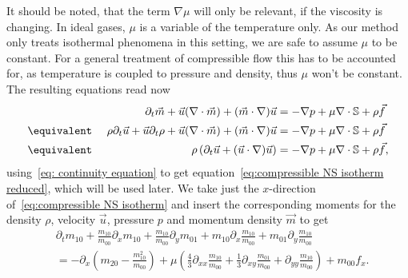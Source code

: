 It should be noted, that the term $\nabla \mu$ will only be relevant, if the viscosity is changing.
In ideal gases, $\mu$ is a variable of the temperature only.
As our method only treats isothermal phenomena in this setting, we are safe to assume $\mu$ to be constant.
For a general treatment of compressible flow this has to be accounted for, as temperature is coupled to pressure and density, thus $\mu$ won't be constant.
The resulting equations read now
\begin{alignat}{3}
  \label{eq:compressible NS isotherm}
  &&\partial_t \vec{m} + \vec{u}(\nabla \cdot \vec{m}) + (\vec{m} \cdot \nabla)\vec{u}
    &= - \nabla p + \mu \nabla \cdot \mathbb{S} + \rho \vec{f}\\
  \nonumber
  &\equivalent\ & \rho\partial_t \vec{u} + \vec{u}\partial_t \rho + \vec{u}(\nabla \cdot \vec{m}) + (\vec{m} \cdot \nabla)\vec{u}
    &= - \nabla p + \mu \nabla \cdot \mathbb{S} + \rho \vec{f}\\
  \label{eq:compressible NS isotherm reduced}
  &\equivalent& \rho\left(\partial_t \vec{u} + (\vec{u} \cdot \nabla)\vec{u}\right)
    &= - \nabla p + \mu \nabla \cdot \mathbb{S} + \rho \vec{f},
\end{alignat}
using~\eqref{eq: continuity equation} to get equation~\eqref{eq:compressible NS isotherm reduced}, which will be used later.
We take just the $x$-direction of~\eqref{eq:compressible NS isotherm} and insert the corresponding moments for the density $\rho$, velocity $\vec{u}$, pressure $p$ and momentum density $\vec{m}$ to get
\begin{equation}
  \label{eq: navier stokes goal}
  \begin{aligned}
    & \partial_t m_{10}
    + \frac{m_{10}}{m_{00}} \partial_x m_{10}
    + \frac{m_{10}}{m_{00}}\partial_y m_{01}
    + m_{10} \partial_x \frac{m_{10}}{m_{00}}
    + m_{01} \partial_y \frac{m_{10}}{m_{00}}
     \\
    & =
    - \partial_x \left(m_{20} - \frac{ m_{10}^2 }{ m_{00} } \right)
     + \mu \left(\frac{4}{3}\partial_{xx}\frac{m_{10}}{m_{00}}
            + \frac{1}{3}\partial_{xy} \frac{m_{01}}{m_{00}}
            + \partial_{yy} \frac{m_{10}}{m_{00}} \right) + m_{00}f_x.
  \end{aligned}
\end{equation}
